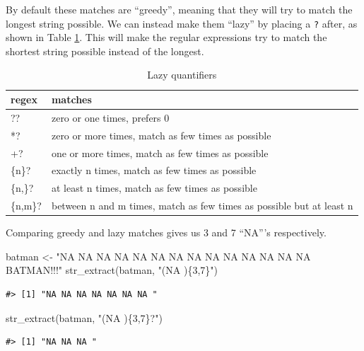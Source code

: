 \documentclass[
]{krantz}
\makeatletter
\newenvironment{Shaded}{\begin{snugshade}}{\end{snugshade}}
\newcommand{\FunctionTok}[1]{\textcolor[rgb]{0.00,0.00,0.00}{#1}}
\newcommand{\NormalTok}[1]{#1}
\newcommand{\OtherTok}[1]{\textcolor[rgb]{0.56,0.35,0.01}{#1}}
\newcommand{\StringTok}[1]{\textcolor[rgb]{0.31,0.60,0.02}{#1}}
\newenvironment{kframe}{%
\medskip{}
\setlength{\fboxsep}{.8em}
 \def\at@end@of@kframe{}%
 \ifinner\ifhmode%
  \def\at@end@of@kframe{\end{minipage}}%
  \begin{minipage}{\columnwidth}%
 \fi\fi%
 \def\FrameCommand##1{\hskip\@totalleftmargin \hskip-\fboxsep
 \colorbox{shadecolor}{##1}\hskip-\fboxsep
     \hskip-\linewidth \hskip-\@totalleftmargin \hskip\columnwidth}%
 \MakeFramed {\advance\hsize-\width
   \@totalleftmargin\z@ \linewidth\hsize
   \@setminipage}}%
 {\par\unskip\endMakeFramed%
 \at@end@of@kframe}
\renewenvironment{Shaded}{\begin{kframe}}{\end{kframe}}
\makeatother
\begin{document}
By default these matches are ``greedy'', meaning that they will try to match the longest string possible. We can instead make them ``lazy'' by placing a \texttt{?} after, as shown in Table \ref{tab:lazyquantifiers}. This will make the regular expressions try to match the shortest string possible instead of the longest.

\begin{table}

\caption{\label{tab:lazyquantifiers}Lazy quantifiers}
\centering
\begin{tabular}[t]{ll}
\toprule
regex & matches\\
\midrule
?? & zero or one times, prefers 0\\
*? & zero or more times, match as few times as possible\\
+? & one or more times, match as few times as possible\\
\{n\}? & exactly n times, match as few times as possible\\
\{n,\}? & at least n times, match as few times as possible\\
\addlinespace
\{n,m\}? & between n and m times, match as few times as possible but at least n\\
\bottomrule
\end{tabular}
\end{table}

Comparing greedy and lazy matches gives us 3 and 7 ``NA'''s respectively.

\begin{Shaded}
\begin{Highlighting}[]
\NormalTok{batman }\OtherTok{\textless{}{-}} \StringTok{"NA NA NA NA NA NA NA NA NA NA NA NA NA NA BATMAN!!!"}
\FunctionTok{str\_extract}\NormalTok{(batman, }\StringTok{"(NA )\{3,7\}"}\NormalTok{)}
\end{Highlighting}
\end{Shaded}

\begin{verbatim}
#> [1] "NA NA NA NA NA NA NA "
\end{verbatim}

\begin{Shaded}
\begin{Highlighting}[]
\FunctionTok{str\_extract}\NormalTok{(batman, }\StringTok{"(NA )\{3,7\}?"}\NormalTok{)}
\end{Highlighting}
\end{Shaded}

\begin{verbatim}
#> [1] "NA NA NA "
\end{verbatim}
\end{document}
